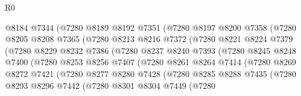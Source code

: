 \begin{lexlean}{R0}
\begin{coremodule}
                    @8184
                    @7344
                    (@7280
                      @8189
                      @8192
                      @7351
                      (@7280
                        @8197
                        @8200
                        @7358
                        (@7280
                          @8205
                          @8208
                          @7365
                          (@7280
                            @8213
                            @8216
                            @7372
                            (@7280
                              @8221
                              @8224
                              @7379
                              (@7280
                                @8229
                                @8232
                                @7386
                                (@7280
                                  @8237
                                  @8240
                                  @7393
                                  (@7280
                                    @8245
                                    @8248
                                    @7400
                                    (@7280
                                      @8253
                                      @8256
                                      @7407
                                      (@7280
                                        @8261
                                        @8264
                                        @7414
                                        (@7280
                                          @8269
                                          @8272
                                          @7421
                                          (@7280
                                            @8277
                                            @8280
                                            @7428
                                            (@7280
                                              @8285
                                              @8288
                                              @7435
                                              (@7280
                                                @8293
                                                @8296
                                                @7442
                                                (@7280
                                                  @8301
                                                  @8304
                                                  @7449
                                                  (@7280

\end{coremodule}
\end{lexlean}
